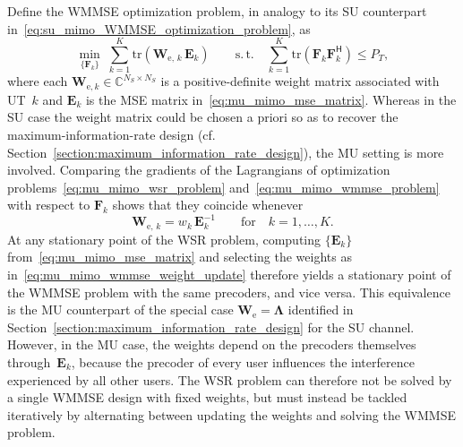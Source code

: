 Define the \ac{WMMSE} optimization problem, in analogy to its \ac{SU} counterpart in~\eqref{eq:su_mimo_WMMSE_optimization_problem}, as
\begin{equation}
\label{eq:mu_mimo_wmmse_problem}
    \min_{\{\mathbf{F}_k\}} \; \sum_{k=1}^{K} \mathrm{tr}(\mathbf{W}_{\mathrm{e}, \,k} \, \mathbf{E}_k) \qquad \mathrm{s.\,t.} \quad \sum_{k=1}^{K} \mathrm{tr}(\mathbf{F}_k \mathbf{F}_k^{\mathsf{H}}) \leq P_T,
\end{equation}
where each $\mathbf{W}_{\mathrm{e}, k} \in \mathbb{C}^{N_S \times N_S}$ is a positive-definite weight matrix associated with \ac{UT}~$k$ and $\mathbf{E}_k$ is the \ac{MSE} matrix in~\eqref{eq:mu_mimo_mse_matrix}.
Whereas in the \ac{SU} case the weight matrix could be chosen a priori so as to recover the maximum-information-rate design (cf. Section~\ref{section:maximum_information_rate_design}), the \ac{MU} setting is more involved.
Comparing the gradients of the Lagrangians of optimization problems~\eqref{eq:mu_mimo_wsr_problem} and~\eqref{eq:mu_mimo_wmmse_problem} with respect to $\mathbf{F}_k$ shows that they coincide whenever~\cite{WMMSE_precoding}
\begin{equation}
\label{eq:mu_mimo_wmmse_weight_update}
    \mathbf{W}_{\mathrm{e}, \,k} = w_k \, \mathbf{E}_k^{-1} \qquad \text{for} \quad k = 1, \dots, K.
\end{equation}
At any stationary point of the \ac{WSR} problem, computing $\{\mathbf{E}_k\}$ from~\eqref{eq:mu_mimo_mse_matrix} and selecting the weights as in~\eqref{eq:mu_mimo_wmmse_weight_update} therefore yields a stationary point of the \ac{WMMSE} problem with the same precoders, and vice versa.
This equivalence is the \ac{MU} counterpart of the special case $\mathbf{W}_{\mathrm{e}} = \mathbf{\Lambda}$ identified in Section~\ref{section:maximum_information_rate_design} for the \ac{SU} channel.
However, in the \ac{MU} case, the weights depend on the precoders themselves through~$\mathbf{E}_k$, because the precoder of every user influences the interference experienced by all other users.
The \ac{WSR} problem can therefore not be solved by a single \ac{WMMSE} design with fixed weights, but must instead be tackled iteratively by alternating between updating the weights and solving the \ac{WMMSE} problem.
\medskip

